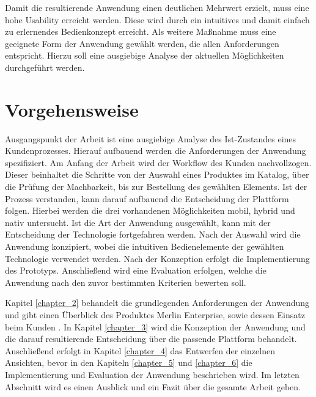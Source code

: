 Damit die resultierende Anwendung einen deutlichen Mehrwert erzielt, muss eine hohe Usability erreicht werden. Diese wird durch ein intuitives und damit einfach zu erlernendes Bedienkonzept erreicht. Als weitere Maßnahme muss eine geeignete Form der Anwendung gewählt werden, die allen Anforderungen entspricht. Hierzu soll eine ausgiebige Analyse der aktuellen Möglichkeiten durchgeführt werden.



\section{Vorgehensweise}
Ausgangspunkt der Arbeit ist eine ausgiebige Analyse des Ist-Zustandes eines Kundenprozesses. Hierauf aufbauend werden die Anforderungen der Anwendung spezifiziert.
Am Anfang der Arbeit wird der Workflow des Kunden nachvollzogen. Dieser beinhaltet die Schritte von der Auswahl eines Produktes im Katalog, über die Prüfung der Machbarkeit, bis zur Bestellung des gewählten Elements. Ist der Prozess verstanden, kann darauf aufbauend die Entscheidung der Plattform folgen. Hierbei werden die drei vorhandenen Möglichkeiten mobil, hybrid und nativ untersucht. Ist die Art der Anwendung ausgewählt, kann mit der Entscheidung der Technologie fortgefahren werden. Nach der Auswahl wird die Anwendung konzipiert, wobei die intuitiven Bedienelemente der gewählten Technologie verwendet werden. Nach der Konzeption erfolgt die Implementierung des Prototyps. Anschließend wird eine Evaluation erfolgen, welche die Anwendung nach den zuvor bestimmten Kriterien bewerten soll.

\par
Kapitel \ref{chapter_2} behandelt die grundlegenden Anforderungen der Anwendung und gibt einen Überblick des Produktes Merlin Enterprise, sowie dessen Einsatz beim Kunden . In Kapitel \ref{chapter_3} wird die Konzeption der Anwendung und die darauf resultierende Entscheidung über die passende Plattform behandelt. Anschließend erfolgt in Kapitel \ref{chapter_4} das Entwerfen der einzelnen Ansichten, bevor in den Kapiteln \ref{chapter_5} und \ref{chapter_6} die Implementierung und Evaluation der Anwendung beschrieben wird. Im letzten Abschnitt wird es einen Ausblick und ein Fazit über die gesamte Arbeit geben.








